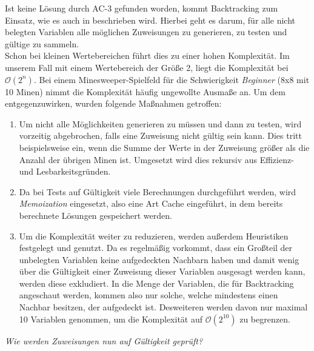 Ist keine Lösung durch AC-3 gefunden worden, kommt Backtracking zum Einsatz, wie es auch in \cite{Alan} beschrieben wird. Hierbei geht es darum,
für alle nicht belegten Variablen alle möglichen Zuweisungen zu generieren, zu testen und gültige zu sammeln.\\ Schon bei kleinen Wertebereichen
führt dies zu einer hohen Komplexität. Im unserem Fall mit einem Wertebereich der Größe 2, liegt die Komplexität bei $\mathcal{O}(2^n)$.
Bei einem Minesweeper-Spielfeld für die Schwierigkeit \textit{Beginner} (8x8 mit 10 Minen) nimmt die Komplexität häufig ungewollte Ausmaße an.
Um dem entgegenzuwirken, wurden folgende Maßnahmen getroffen:
\begin{enumerate}
    \item Um nicht alle Möglichkeiten generieren zu müssen und dann zu testen, wird vorzeitig abgebrochen, falls eine Zuweisung nicht gültig sein
    kann. Dies tritt beispielsweise ein, wenn die Summe der Werte in der Zuweisung größer als die Anzahl der übrigen Minen ist. Umgesetzt wird
    dies rekursiv aus Effizienz- und Lesbarkeitsgründen.
    \item Da bei Tests auf Gültigkeit viele Berechnungen durchgeführt werden, wird \textit{Memoization} eingesetzt, also eine Art Cache eingeführt,
    in dem bereits berechnete Lösungen gespeichert werden. 
    \item Um die Komplexität weiter zu reduzieren, werden außerdem Heuristiken festgelegt und genutzt. Da es regelmäßig vorkommt, dass ein
    Großteil der unbelegten Variablen keine aufgedeckten Nachbarn haben und damit wenig über die Gültigkeit einer Zuweisung dieser Variablen
    ausgesagt werden kann, werden diese exkludiert. In die Menge der Variablen, die für Backtracking angeschaut werden, kommen also nur solche,
    welche mindestens einen Nachbar besitzen, der aufgedeckt ist. Desweiteren werden davon nur maximal 10 Variablen genommen, um die Komplexität
    auf $\mathcal{O}(2^{10})$ zu begrenzen.
\end{enumerate}

\textit{Wie werden Zuweisungen nun auf Gültigkeit geprüft?}

